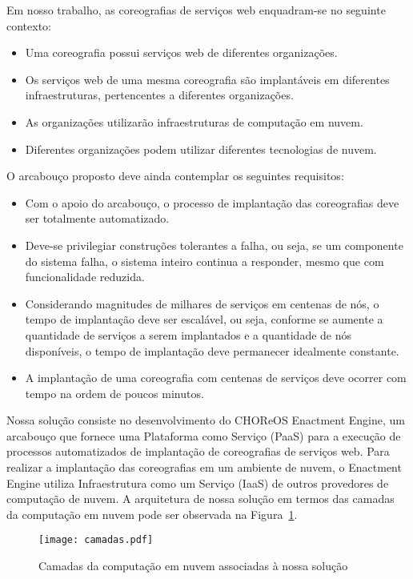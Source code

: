 Em nosso trabalho, as coreografias de serviços web enquadram-se no seguinte contexto:

\begin{itemize}
\item Uma coreografia possui serviços web de diferentes organizações.
\item Os serviços web de uma mesma coreografia são implantáveis em diferentes infraestruturas, pertencentes a diferentes organizações.
\item As organizações utilizarão infraestruturas de computação em nuvem.
\item Diferentes organizações podem utilizar diferentes tecnologias de nuvem.
\end{itemize}

O arcabouço proposto deve ainda contemplar os seguintes requisitos:

\begin{itemize}
\item Com o apoio do arcabouço, o processo de implantação das coreografias deve ser totalmente automatizado.
\item Deve-se privilegiar construções tolerantes a falha, ou seja, se um componente do sistema falha, o sistema inteiro continua a responder, mesmo que com funcionalidade reduzida.
\item Considerando magnitudes de milhares de serviços em centenas de nós, o tempo de implantação deve ser escalável, ou seja, conforme se aumente a quantidade de serviços a serem implantados e a quantidade de nós disponíveis, o tempo de implantação deve permanecer idealmente constante. 
\item A implantação de uma coreografia com centenas de serviços deve ocorrer com tempo na ordem de poucos minutos.
\end{itemize}

Nossa solução consiste no desenvolvimento do CHOReOS Enactment Engine, um arcabouço que fornece uma Plataforma como Serviço (PaaS) para a execução de processos automatizados de implantação de coreografias de serviços web. Para realizar a implantação das coreografias em um ambiente de nuvem, o Enactment Engine utiliza Infraestrutura como um Serviço (IaaS) de outros provedores de computação de nuvem. A arquitetura de nossa solução em termos das camadas da computação em nuvem pode ser observada na Figura~\ref{fig:camadas_nuvem}.

\begin{figure}[!h]
  \centering
  \texttt{[image: camadas.pdf]} 
  \caption{Camadas da computação em nuvem associadas à nossa solução}
  \label{fig:camadas_nuvem} 
\end{figure}

